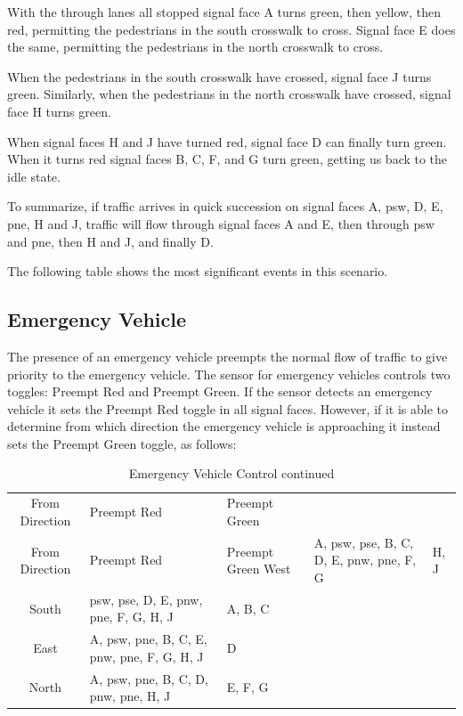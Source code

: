 \documentclass[letterpaper,twoside]{article}
\begin{document}
With the through lanes all stopped signal face A turns
green, then yellow, then red, permitting the pedestrians in the south
crosswalk to cross.  Signal face E does the same, permitting the
pedestrians in the north crosswalk to cross.

When the pedestrians in the south crosswalk have crossed, signal
face J turns green.  Similarly, when the pedestrians in the
north crosswalk have crossed, signal face H turns green.

When signal faces H and J have turned red, signal face D
can finally turn green.  When it turns red signal faces
B, C, F, and G turn green, getting us back to the idle state.

To summarize, if traffic arrives in quick succession on signal faces
A, psw, D, E, pne, H and J, traffic will flow through signal faces
A and E, then through psw and pne, then H and J, and finally D.

The following table shows the most significant events in this scenario.



\subsection{Emergency Vehicle}

The presence of an emergency vehicle preempts the normal flow of traffic
to give priority to the emergency vehicle. The sensor for emergency
vehicles controls two toggles: Preempt Red and Preempt Green.
If the sensor detects an emergency
vehicle it sets the Preempt Red toggle in all signal faces.
However, if it is able to determine from which direction the emergency vehicle
is approaching it instead sets the Preempt Green toggle, as follows:

\begin{longtable}{c | l | l}
  \caption{Emergency Vehicle control} \\
  From Direction & Preempt Red & Preempt Green \endfirsthead
  \caption{Emergency Vehicle Control continued} \\
  From Direction & Preempt Red & Preempt Green \endhead
  \hline West & A, psw, pse, B, C, D, E, pnw, pne, F, G & H, J \\
  \hline South & psw, pse, D, E, pnw, pne, F, G, H, J & A, B, C \\
  \hline East & A, psw, pne, B, C, E, pnw, pne, F, G, H, J & D \\
  \hline North & A, psw, pne, B, C, D, pnw, pne, H, J & E, F, G \\
  \hline
\end{longtable}
\end{document}
